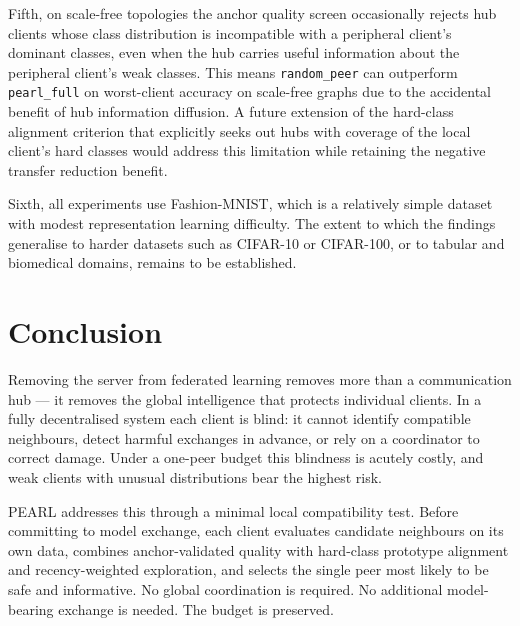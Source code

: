 \documentclass[conference]{IEEEtran}
\begin{document}
Fifth, on scale-free topologies the anchor quality screen occasionally rejects hub clients whose class distribution is incompatible with a peripheral client's dominant classes, even when the hub carries useful information about the peripheral client's weak classes. This means \texttt{random\_peer} can outperform \texttt{pearl\_full} on worst-client accuracy on scale-free graphs due to the accidental benefit of hub information diffusion. A future extension of the hard-class alignment criterion that explicitly seeks out hubs with coverage of the local client's hard classes would address this limitation while retaining the negative transfer reduction benefit.

Sixth, all experiments use Fashion-MNIST, which is a relatively simple dataset with modest representation learning difficulty. The extent to which the findings generalise to harder datasets such as CIFAR-10 or CIFAR-100, or to tabular and biomedical domains, remains to be established.


\section{Conclusion}
\label{sec:conclusion}

Removing the server from federated learning removes more than a communication hub --- it removes the global intelligence that protects individual clients. In a fully decentralised system each client is blind: it cannot identify compatible neighbours, detect harmful exchanges in advance, or rely on a coordinator to correct damage. Under a one-peer budget this blindness is acutely costly, and weak clients with unusual distributions bear the highest risk.

PEARL addresses this through a minimal local compatibility test. Before committing to model exchange, each client evaluates candidate neighbours on its own data, combines anchor-validated quality with hard-class prototype alignment and recency-weighted exploration, and selects the single peer most likely to be safe and informative. No global coordination is required. No additional model-bearing exchange is needed. The budget is preserved.
\end{document}
